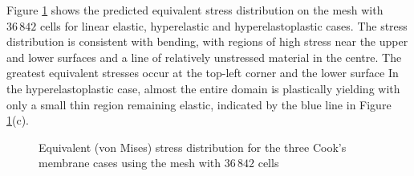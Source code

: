 \documentclass[sn-mathphys,Numbered]{sn-jnl}%
\begin{document}
Figure \ref{fig:cooksMembrane_sigmaEq} shows the predicted equivalent stress distribution on the mesh with $36\,842$ cells for linear elastic, hyperelastic and hyperelastoplastic cases.
The stress distribution is consistent with bending, with regions of high stress near the upper and lower surfaces and a line of relatively unstressed material in the centre.
The greatest equivalent stresses occur at the top-left corner and the lower surface
In the hyperelastoplastic case, almost the entire domain is plastically yielding with only a small thin region remaining elastic, indicated by the blue line in Figure \ref{fig:cooksMembrane_sigmaEq}(c).
\begin{figure}[htbp]
   \centering
   \caption{Equivalent (von Mises) stress distribution for the three Cook's membrane cases using the mesh with $36\,842$ cells}
   \label{fig:cooksMembrane_sigmaEq}
\end{figure}
\end{document}
